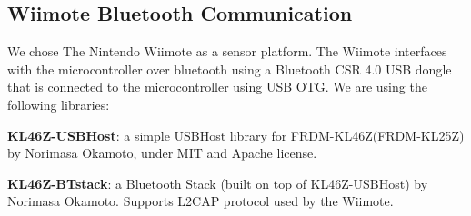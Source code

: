 \documentclass{tufte-handout}
\begin{document}
\subsection{Wiimote Bluetooth Communication}
We chose The Nintendo Wiimote as a sensor platform.
The Wiimote interfaces with the microcontroller over bluetooth using a Bluetooth CSR 4.0 USB dongle that is
connected to the microcontroller using USB OTG. 
We are using the following libraries:

\begin{enumerate*}
    \item
        \textbf{KL46Z-USBHost}:
a simple USBHost library for FRDM-KL46Z(FRDM-KL25Z) by Norimasa Okamoto, under MIT and Apache license.
\item
    \textbf{KL46Z-BTstack}:
a Bluetooth Stack (built on top of KL46Z-USBHost) by Norimasa Okamoto. Supports L2CAP protocol used by the Wiimote.
\end{enumerate*}
\end{document}
